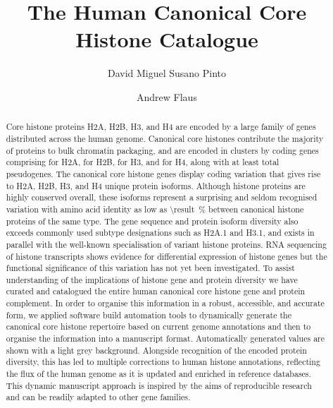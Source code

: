 \documentclass[9pt,lineno]{elife}
\title{The Human Canonical Core Histone Catalogue}
\author[1,\authfn{1}]{David Miguel Susano Pinto}
\author[1]{Andrew Flaus}
\affil[1]{Centre for Chromosome Biology, School of Natural Sciences,
  National University of Ireland Galway, Galway, Ireland}
\begin{document}
  \maketitle

  \begin{abstract}
    Core histone proteins H2A, H2B, H3, and H4 are encoded
    by a large family of genes distributed across the human genome.
    Canonical core histones contribute the majority of proteins to bulk chromatin packaging,
    and are encoded in \NumberOfClusters{} clusters
    by \TotalCoreCodingGenes{} coding genes comprising
    \HTwoACodingGenes{} for H2A,
    \HTwoBCodingGenes{} for H2B,
    \HThreeCodingGenes{} for H3,
    and \HFourCodingGenes{} for H4,
    along with at least \TotalCorePseudoGenes{} total pseudogenes.
    The canonical core histone genes display coding variation that gives rise to
    \HTwoAUniqueProteins{} H2A, \HTwoBUniqueProteins{} H2B,
    \HThreeUniqueProteins{} H3, and \HFourUniqueProteins{} H4 unique protein isoforms.
    Although histone proteins are highly conserved overall,
    these isoforms represent a surprising and seldom recognised variation
    with amino acid identity as low as
     \SI{\result}{\percent}
    between canonical histone proteins of the same type.
    The gene sequence and protein isoform diversity
    also exceeds commonly used subtype designations such as H2A.1 and H3.1,
    and exists in parallel with the well-known specialisation of variant histone proteins.
    RNA sequencing of histone transcripts shows evidence for
    differential expression of histone genes
    but the functional significance of this variation has not yet been investigated.
    To assist understanding of the implications of histone gene and protein diversity
    we have curated and catalogued the entire human canonical core
    histone gene and protein complement.
    In order to organise this information in a
    robust, accessible, and accurate form,
    we applied software build automation tools to
    dynamically generate the canonical core histone repertoire
    based on current genome annotations
    and then to organise the information into a manuscript format.
    Automatically generated values are shown with a light grey background.
    Alongside recognition of the encoded protein diversity,
    this has led to multiple corrections to human histone annotations,
    reflecting the flux of the human genome as it is updated and
    enriched in reference databases.
    This dynamic manuscript approach is inspired by the aims of reproducible research
    and can be readily adapted to other gene families.
  \end{abstract}
\end{document}
